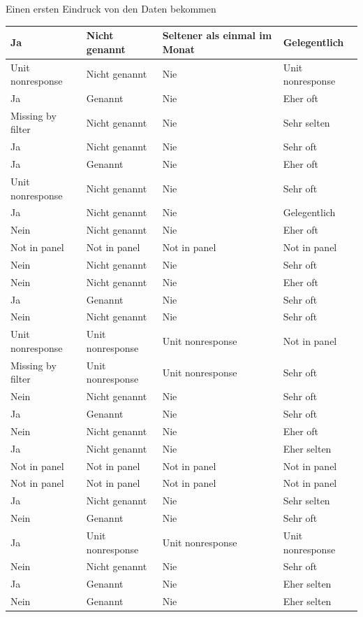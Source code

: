 \documentclass[ignorenonframetext,]{beamer}
\begin{document}
\begin{frame}{Einen ersten Eindruck von den Daten bekommen}
\begin{tabular}{l|l|l|l}
\hline
Ja & Nicht genannt & Seltener als einmal im Monat & Gelegentlich\\
\hline
Unit nonresponse & Nicht genannt & Nie & Unit nonresponse\\
\hline
Ja & Genannt & Nie & Eher oft\\
\hline
Missing by filter & Nicht genannt & Nie & Sehr selten\\
\hline
Ja & Nicht genannt & Nie & Sehr oft\\
\hline
Ja & Genannt & Nie & Eher oft\\
\hline
Unit nonresponse & Nicht genannt & Nie & Sehr oft\\
\hline
Ja & Nicht genannt & Nie & Gelegentlich\\
\hline
Nein & Nicht genannt & Nie & Eher oft\\
\hline
Not in panel & Not in panel & Not in panel & Not in panel\\
\hline
Nein & Nicht genannt & Nie & Sehr oft\\
\hline
Nein & Nicht genannt & Nie & Eher oft\\
\hline
Ja & Genannt & Nie & Sehr oft\\
\hline
Nein & Nicht genannt & Nie & Sehr oft\\
\hline
Unit nonresponse & Unit nonresponse & Unit nonresponse & Not in panel\\
\hline
Missing by filter & Unit nonresponse & Unit nonresponse & Sehr oft\\
\hline
Nein & Nicht genannt & Nie & Sehr oft\\
\hline
Ja & Genannt & Nie & Sehr oft\\
\hline
Nein & Nicht genannt & Nie & Eher oft\\
\hline
Ja & Nicht genannt & Nie & Eher selten\\
\hline
Not in panel & Not in panel & Not in panel & Not in panel\\
\hline
Not in panel & Not in panel & Not in panel & Not in panel\\
\hline
Ja & Nicht genannt & Nie & Sehr selten\\
\hline
Nein & Genannt & Nie & Sehr oft\\
\hline
Ja & Unit nonresponse & Unit nonresponse & Unit nonresponse\\
\hline
Nein & Nicht genannt & Nie & Sehr oft\\
\hline
Ja & Genannt & Nie & Eher selten\\
\hline
Nein & Genannt & Nie & Eher selten\\

\end{tabular}
\end{frame}
\end{document}
